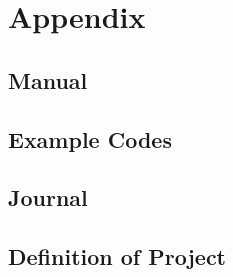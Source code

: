 \appendix
\part*{Appendix}

\chapter{Manual}




\chapter{Example Codes}
\label{ctr:exampleCode}


\chapter{Journal}


\chapter{Definition of Project}
\begin{figure}[H]
\centering
\setlength\fboxsep{0pt}
\setlength\fboxrule{0.5pt}
\end{figure}
